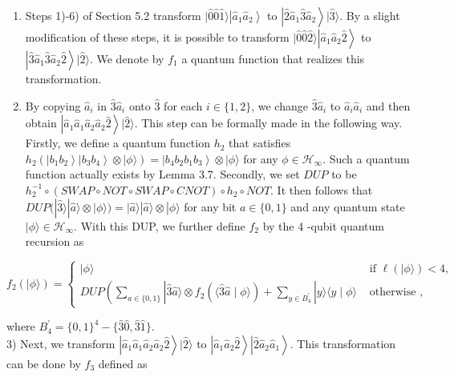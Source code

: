 \documentclass[10pt]{article}
\begin{document}
\begin{enumerate}
  \item Steps 1)-6) of Section 5.2 transform $|\hat{0} \hat{0} \hat{1}\rangle\left|\hat{a}_{1} \hat{a}_{2}\right\rangle$ to $\left|\hat{2} \hat{a}_{1} \hat{3} \hat{a}_{2}\right\rangle|\hat{3}\rangle$. By a slight modification of these steps, it is possible to transform $|\hat{0} \hat{0} \hat{2}\rangle\left|\hat{a}_{1} \hat{a}_{2} \hat{2}\right\rangle$ to $\left|\hat{3} \hat{a}_{1} \hat{3} \hat{a}_{2} \hat{2}\right\rangle|\hat{2}\rangle$. We denote by $f_{1}$ a quantum function that realizes this transformation.
  \item By copying $\hat{a}_{i}$ in $\hat{3} \hat{a}_{i}$ onto $\hat{3}$ for each $i \in\{1,2\}$, we change $\hat{3} \hat{a}_{i}$ to $\hat{a}_{i} \hat{a}_{i}$ and then obtain $\left|\hat{a}_{1} \hat{a}_{1} \hat{a}_{2} \hat{a}_{2} \hat{2}\right\rangle|\hat{2}\rangle$. This step can be formally made in the following way. Firstly, we define a quantum function $h_{2}$ that satisfies $h_{2}\left(\left|b_{1} b_{2}\right\rangle\left|b_{3} b_{4}\right\rangle \otimes|\phi\rangle\right)=\left|b_{4} b_{2} b_{1} b_{3}\right\rangle \otimes|\phi\rangle$ for any $\phi \in \mathcal{H}_{\infty}$. Such a quantum function actually exists by Lemma 3.7. Secondly, we set $D U P$ to be $h_{2}^{-1} \circ(S W A P \circ N O T \circ S W A P \circ C N O T) \circ h_{2} \circ N O T$. It then follows that\\
$D U P(|\hat{3}\rangle|\hat{a}\rangle \otimes|\phi\rangle)=|\hat{a}\rangle|\hat{a}\rangle \otimes|\phi\rangle$ for any bit $a \in\{0,1\}$ and any quantum state $|\phi\rangle \in \mathcal{H}_{\infty}$. With this DUP, we further define $f_{2}$ by the 4 -qubit quantum recursion as
\end{enumerate}

$$
f_{2}(|\phi\rangle)= \begin{cases}|\phi\rangle & \text { if } \ell(|\phi\rangle)<4, \\ D U P\left(\sum_{a \in\{0,1\}}|\hat{3} \hat{a}\rangle \otimes f_{2}(\langle\hat{3} \hat{a} \mid \phi\rangle)+\sum_{y \in B_{4}^{\prime}}|y\rangle\langle y \mid \phi\rangle\right. & \text { otherwise },\end{cases}
$$

where $B_{4}^{\prime}=\{0,1\}^{4}-\{\hat{3} \hat{0}, \hat{3} \hat{1}\}$.\\
3) Next, we transform $\left|\hat{a}_{1} \hat{a}_{1} \hat{a}_{2} \hat{a}_{2} \hat{2}\right\rangle|\hat{2}\rangle$ to $\left|\hat{a}_{1} \hat{a}_{2} \hat{2}\right\rangle\left|\hat{2} \hat{a}_{2} \hat{a}_{1}\right\rangle$. This transformation can be done by $f_{3}$ defined as
\end{document}
